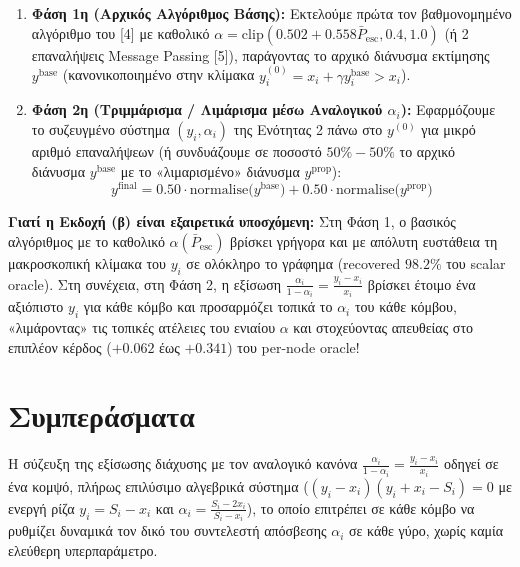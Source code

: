 \documentclass[11pt, a4paper]{article}
\begin{document}
\begin{enumerate}
    \item \textbf{Φάση 1η (Αρχικός Αλγόριθμος Βάσης):} Εκτελούμε πρώτα τον βαθμονομημένο αλγόριθμο του [4] με καθολικό $\alpha = \mathrm{clip}(0.502 + 0.558 \bar{P}_{\mathrm{esc}}, 0.4, 1.0)$ (ή 2 επαναλήψεις Message Passing [5]), παράγοντας το αρχικό διάνυσμα εκτίμησης $y^{\mathrm{base}}$ (κανονικοποιημένο στην κλίμακα $y_i^{(0)} = x_i + \gamma y_i^{\mathrm{base}} > x_i$).
    \item \textbf{Φάση 2η (Τριμμάρισμα / Λιμάρισμα μέσω Αναλογικού $\alpha_i$):} Εφαρμόζουμε το συζευγμένο σύστημα $(y_i, \alpha_i)$ της Ενότητας 2 πάνω στο $y^{(0)}$ για μικρό αριθμό επαναλήψεων (ή συνδυάζουμε σε ποσοστό $50\% - 50\%$ το αρχικό διάνυσμα $y^{\mathrm{base}}$ με το «λιμαρισμένο» διάνυσμα $y^{\mathrm{prop}}$):
    \[
    y^{\mathrm{final}} = 0.50 \cdot \mathrm{normalise}\big(y^{\mathrm{base}}\big) + 0.50 \cdot \mathrm{normalise}\big(y^{\mathrm{prop}}\big)
    \]
\end{enumerate}

\noindent\textbf{Γιατί η Εκδοχή (β) είναι εξαιρετικά υποσχόμενη:} Στη Φάση 1, ο βασικός αλγόριθμος με το καθολικό $\alpha(\bar{P}_{\mathrm{esc}})$ βρίσκει γρήγορα και με απόλυτη ευστάθεια τη μακροσκοπική κλίμακα του $y_i$ σε ολόκληρο το γράφημα (recovered $98.2\%$ του scalar oracle). Στη συνέχεια, στη Φάση 2, η εξίσωση $\frac{\alpha_i}{1 - \alpha_i} = \frac{y_i - x_i}{x_i}$ βρίσκει έτοιμο ένα αξιόπιστο $y_i$ για κάθε κόμβο και προσαρμόζει τοπικά το $\alpha_i$ του κάθε κόμβου, «λιμάροντας» τις τοπικές ατέλειες του ενιαίου $\alpha$ και στοχεύοντας απευθείας στο επιπλέον κέρδος ($+0.062$ έως $+0.341$) του per-node oracle!

\section{Συμπεράσματα}

Η σύζευξη της εξίσωσης διάχυσης με τον αναλογικό κανόνα $\frac{\alpha_i}{1 - \alpha_i} = \frac{y_i - x_i}{x_i}$ οδηγεί σε ένα κομψό, πλήρως επιλύσιμο αλγεβρικά σύστημα ($(y_i - x_i)(y_i + x_i - S_i) = 0$ με ενεργή ρίζα $y_i = S_i - x_i$ και $\alpha_i = \frac{S_i - 2x_i}{S_i - x_i}$), το οποίο επιτρέπει σε κάθε κόμβο να ρυθμίζει δυναμικά τον δικό του συντελεστή απόσβεσης $\alpha_i$ σε κάθε γύρο, χωρίς καμία ελεύθερη υπερπαράμετρο.
\end{document}
